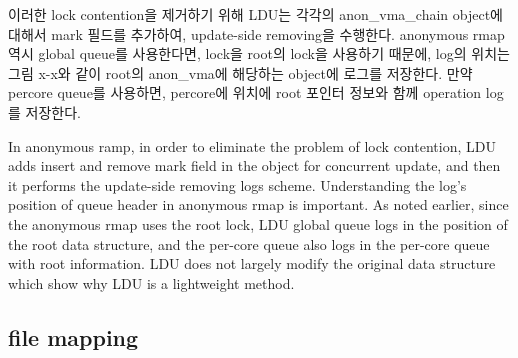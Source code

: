 \ifkor
이러한 lock contention을 제거하기 위해 LDU는 각각의 anon\_vma\_chain object에 대해서
mark 필드를 추가하여, update-side removing을 수행한다.
anonymous rmap역시 global queue를 사용한다면, lock을 root의 lock을 사용하기 때문에, log의 위치는 그림
x-x와 같이 root의 anon\_vma에 해당하는 object에 로그를 저장한다. 
만약 percore queue를 사용하면, percore에 위치에 root 포인터 정보와 함께 operation log를 저장한다.
\else

In anonymous ramp, in order to eliminate the problem of lock contention, LDU
adds insert and remove mark field in the  object for concurrent
update, and then it performs the update-side removing logs scheme.
Understanding the log's position of queue header in anonymous rmap is important.
As noted earlier, since the anonymous rmap uses the root lock, LDU global
queue logs in the position of the root data structure, and the per-core queue
also logs in the per-core queue with root information.
LDU does not largely modify the original data structure which show why LDU is a
lightweight method.
\fi


\subsection{file mapping}

